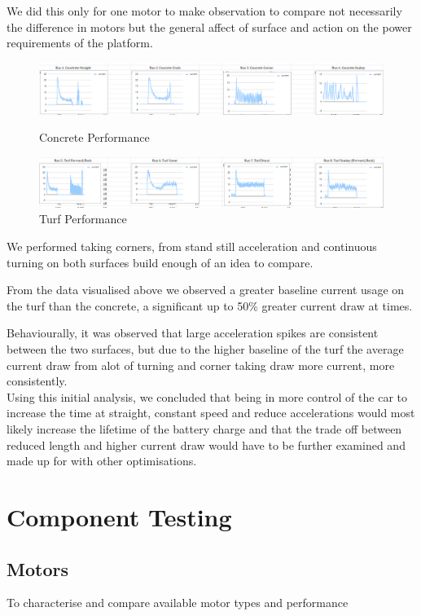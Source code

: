 \documentclass[11pt]{article}
\begin{document}
We did this only for one motor to make observation to compare not necessarily the difference in motors but the general affect of surface and action on the power requirements of the platform.

\begin{figure}[h!]
    \begin{center}
        \includegraphics[width=\textwidth]{inc/contrete_behaviour.png}
        \caption{Concrete Performance}
        \includegraphics[width=\textwidth]{inc/turf_behaviour.png}
        \caption{Turf Performance}
    \end{center}
\end{figure}

We performed taking corners, from stand still acceleration and continuous turning on both surfaces build enough of an idea to compare.

From the data visualised above we observed a greater baseline current usage on the turf than the concrete, a significant up to 50\% greater current draw at times.

Behaviourally, it was observed that large acceleration spikes are consistent between the two surfaces, but due to the higher baseline of the turf the average current draw from alot of turning and corner taking draw more current, more consistently.\\

Using this initial analysis, we concluded that being in more control of the car to increase the time at straight, constant speed and reduce accelerations would most likely increase the lifetime of the battery charge and that the trade off between reduced length and higher current draw would have to be further examined and made up for with other optimisations.



\section{Component Testing}
\subsection{Motors}
To characterise and compare available motor types and performance
\end{document}
